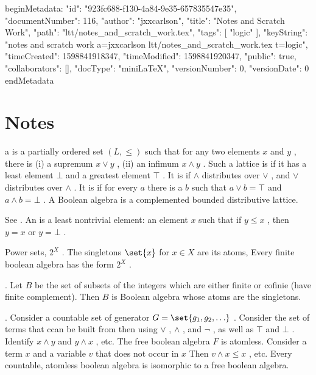 beginMetadata:
{
    "id": "923fc688-f130-4a84-9e35-657835547e35",
    "documentNumber": 116,
    "author": "jxxcarlson",
    "title": "Notes and Scratch Work",
    "path": "ltt/notes_and_scratch_work.tex",
    "tags": [
        "logic"
    ],
    "keyString": "notes and scratch work a=jxxcarlson ltt/notes_and_scratch_work.tex t=logic",
    "timeCreated": 1598841918347,
    "timeModified": 1598841920347,
    "public": true,
    "collaborators": [],
    "docType": "miniLaTeX",
    "versionNumber": 0,
    "versionDate": 0
}
endMetadata
 \section{Notes} 

  a  is a partially ordered set 
$ (L, \le) $ 
 such that for any two elements 
$ x $ 
 and 
$ y $ 
, there is (i) a supremum 
$ x \lor y $ 
, (ii) an infimum 
$ x \land y $ 
.  Such a lattice is  if it has a least element 
$ \bot $ 
 and a greatest element 
$ \top $ 
.  It is  if 
$ \land $ 
 distributes over 
$ \lor $ 
, and 
$ \lor $ 
 distributes over 
$ \land $ 
.  It is  if for every 
$ a $ 
 there is a 
$ b $ 
 such that 
$ a \lor b  = \top $ 
 and 
$ a \land b = \bot $ 
. A Boolean algebra is a complemented bounded distributive lattice.



 See \cite{BT} . An  is a least nontrivial element: an element 
$ x $ 
 such that if 
$ y \le x $ 
, then 
$ y = x $ 
 or 
$ y = \bot $ 
.


   Power sets, 
$ 2^X $ 
.  The singletons 
$ \set{x} $ 
 for 
$ x \in X $ 
 are its atoms,  Every finite boolean algebra has the form 
$ 2^X $ 
.


 .  Let 
$ B $ 
 be the set of subsets of the integers which are either finite or cofinie (have finite complement).  Then 
$ B $ 
 is Boolean algebra whose atoms are the singletons.


  . Consider a countable set of generator 
$ G = \set{g_1, g_2, \ldots } $ 
. Consider the set of terms that ccan be built from then using 
$ \lor $ 
, 
$ \land $ 
, and 
$ \neg $ 
, as well as 
$ \top $ 
 and 
$ \bot $ 
. Identify 
$ x\land y $ 
 and 
$ y \land x $ 
, etc. The free boolean algebra 
$ F $ 
 is atomless.  Consider a term 
$ x $ 
 and a variable 
$ v $ 
 that does not occur in 
$ x $ 
 Then 
$ v \land x \le x $ 
, etc.  Every countable, atomless boolean algebra is isomorphic to a free boolean algebra.


